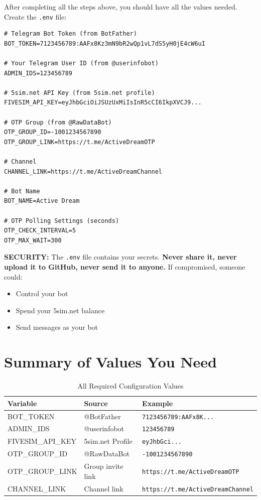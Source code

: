 After completing all the steps above, you should have all the values needed. Create the \texttt{.env} file:

\begin{lstlisting}[style=envstyle, title=.env --- Your Configuration File]
# Telegram Bot Token (from BotFather)
BOT_TOKEN=7123456789:AAFx8Kz3mN9bR2wQp1vL7dS5yH0jE4cW6uI

# Your Telegram User ID (from @userinfobot)
ADMIN_IDS=123456789

# 5sim.net API Key (from 5sim.net profile)
FIVESIM_API_KEY=eyJhbGciOiJSUzUxMiIsInR5cCI6IkpXVCJ9...

# OTP Group (from @RawDataBot)
OTP_GROUP_ID=-1001234567890
OTP_GROUP_LINK=https://t.me/ActiveDreamOTP

# Channel
CHANNEL_LINK=https://t.me/ActiveDreamChannel

# Bot Name
BOT_NAME=Active Dream

# OTP Polling Settings (seconds)
OTP_CHECK_INTERVAL=5
OTP_MAX_WAIT=300
\end{lstlisting}

\begin{importantbox}
\textbf{SECURITY:} The \texttt{.env} file contains your secrets. \textbf{Never share it, never upload it to GitHub, never send it to anyone.} If compromised, someone could:
\begin{itemize}
    \item Control your bot
    \item Spend your 5sim.net balance
    \item Send messages as your bot
\end{itemize}
\end{importantbox}

\section{Summary of Values You Need}

\begin{table}[H]
\centering
\caption{All Required Configuration Values}
\begin{tabularx}{\textwidth}{|l|l|X|}
\hline
\textbf{Variable} & \textbf{Source} & \textbf{Example} \\
\hline
BOT\_TOKEN & @BotFather & \texttt{7123456789:AAFx8K...} \\
\hline
ADMIN\_IDS & @userinfobot & \texttt{123456789} \\
\hline
FIVESIM\_API\_KEY & 5sim.net Profile & \texttt{eyJhbGci...} \\
\hline
OTP\_GROUP\_ID & @RawDataBot & \texttt{-1001234567890} \\
\hline
OTP\_GROUP\_LINK & Group invite link & \texttt{https://t.me/ActiveDreamOTP} \\
\hline
CHANNEL\_LINK & Channel link & \texttt{https://t.me/ActiveDreamChannel} \\
\hline
\end{tabularx}
\end{table}
